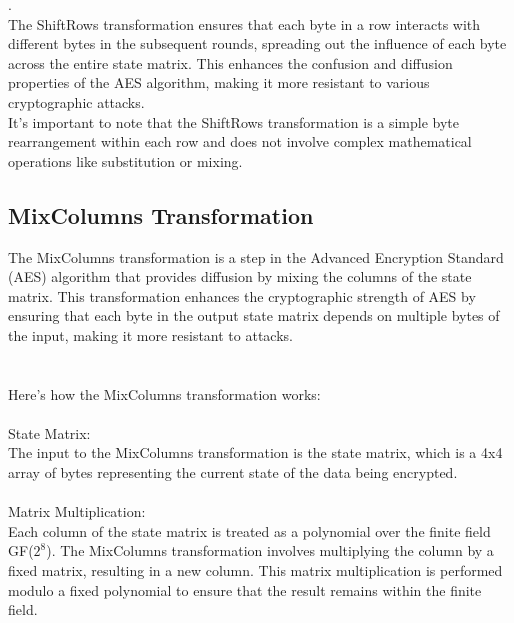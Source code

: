 \documentclass{report}
\begin{document}
.\\
The ShiftRows transformation ensures that each byte in a row interacts with different bytes in the subsequent rounds, spreading out the influence of each byte across the entire state matrix. This enhances the confusion and diffusion properties of the AES algorithm, making it more resistant to various cryptographic attacks.\\
It's important to note that the ShiftRows transformation is a simple byte rearrangement within each row and does not involve complex mathematical operations like substitution or mixing.


\subsection{MixColumns Transformation}
The MixColumns transformation is a step in the Advanced Encryption Standard (AES) algorithm that provides diffusion by mixing the columns of the state matrix. This transformation enhances the cryptographic strength of AES by ensuring that each byte in the output state matrix depends on multiple bytes of the input, making it more resistant to attacks.\\
\\
\\
Here's how the MixColumns transformation works:\\
\\
State Matrix:\\
The input to the MixColumns transformation is the state matrix, which is a 4x4 array of bytes representing the current state of the data being encrypted.\\
\\
Matrix Multiplication:\\
Each column of the state matrix is treated as a polynomial over the finite field GF($2^8$). The MixColumns transformation involves multiplying the column by a fixed matrix, resulting in a new column. This matrix multiplication is performed modulo a fixed polynomial to ensure that the result remains within the finite field.
\end{document}
